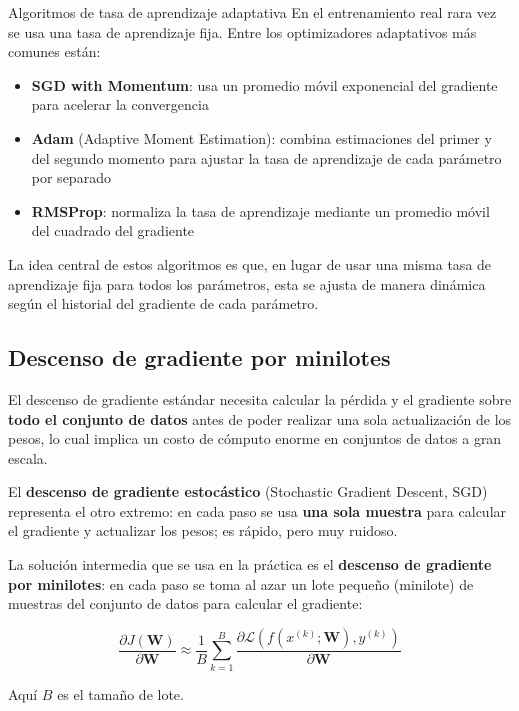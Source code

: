 \begin{importantbox}{Algoritmos de tasa de aprendizaje adaptativa}
En el entrenamiento real rara vez se usa una tasa de aprendizaje fija. Entre los optimizadores adaptativos más comunes están:
\begin{itemize}
\item \textbf{SGD with Momentum}: usa un promedio móvil exponencial del gradiente para acelerar la convergencia
\item \textbf{Adam} (Adaptive Moment Estimation): combina estimaciones del primer y del segundo momento para ajustar la tasa de aprendizaje de cada parámetro por separado
\item \textbf{RMSProp}: normaliza la tasa de aprendizaje mediante un promedio móvil del cuadrado del gradiente
\end{itemize}
La idea central de estos algoritmos es que, en lugar de usar una misma tasa de aprendizaje fija para todos los parámetros, esta se ajusta de manera dinámica según el historial del gradiente de cada parámetro.
\end{importantbox}

\subsection{Descenso de gradiente por minilotes}

El descenso de gradiente estándar necesita calcular la pérdida y el gradiente sobre \textbf{todo el conjunto de datos} antes de poder realizar una sola actualización de los pesos, lo cual implica un costo de cómputo enorme en conjuntos de datos a gran escala.

El \textbf{descenso de gradiente estocástico} (Stochastic Gradient Descent, SGD) representa el otro extremo: en cada paso se usa \textbf{una sola muestra} para calcular el gradiente y actualizar los pesos; es rápido, pero muy ruidoso.

La solución intermedia que se usa en la práctica es el \textbf{descenso de gradiente por minilotes}: en cada paso se toma al azar un lote pequeño (minilote) de muestras del conjunto de datos para calcular el gradiente:

$$\frac{\partial J(\mathbf{W})}{\partial \mathbf{W}} \approx \frac{1}{B}\sum_{k=1}^{B}\frac{\partial \mathcal{L}(f(x^{(k)}; \mathbf{W}), y^{(k)})}{\partial \mathbf{W}}$$

Aquí $B$ es el tamaño de lote.

